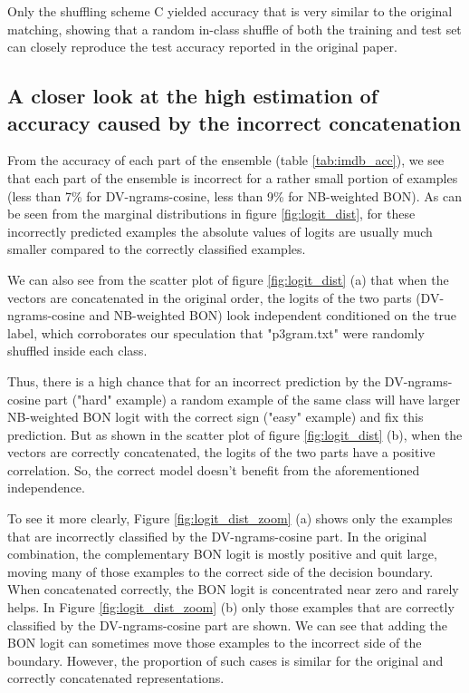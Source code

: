 \documentclass[11pt]{article}
\begin{document}
Only the shuffling scheme C yielded accuracy that is very similar to the original matching, showing that a random in-class shuffle of both the training and test set can closely reproduce the test accuracy reported in the original paper.

\subsection{A closer look at the high estimation of accuracy caused by the incorrect concatenation}
\label{sec:subsec_hard_n_easy}
From the accuracy of each part of the ensemble (table \ref{tab:imdb_acc}), we see that each part of the ensemble is incorrect for a rather small portion of examples (less than 7\% for DV-ngrams-cosine, less than 9\% for NB-weighted BON). As can be seen from the marginal distributions in figure \ref{fig:logit_dist}, for these incorrectly predicted examples the absolute values of logits are usually much smaller compared to the correctly classified examples. 

We can also see from the scatter plot of figure \ref{fig:logit_dist} (a) that when the vectors are concatenated in the original order, the logits of the two parts (DV-ngrams-cosine and NB-weighted BON) look independent conditioned on the true label, which corroborates our speculation that "p3gram.txt" were randomly shuffled inside each class. 

Thus, there is a high chance that for an incorrect prediction by the DV-ngrams-cosine part ("hard" example) a random example of the same class will have larger NB-weighted BON logit with the correct sign ("easy" example) and fix this prediction. But as shown in the scatter plot of figure \ref{fig:logit_dist} (b), when the vectors are correctly concatenated, the logits of the two parts have a positive correlation. So, the correct model doesn't benefit from the aforementioned independence.

To see it more clearly, Figure \ref{fig:logit_dist_zoom} (a) shows only the examples that are incorrectly classified by the DV-ngrams-cosine part. In the original combination, the complementary BON logit is mostly positive and quit large, moving many of those examples to the correct side of the decision boundary. When concatenated correctly, the BON logit is concentrated near zero and rarely helps. In Figure \ref{fig:logit_dist_zoom} (b) only those examples that are correctly classified by the DV-ngrams-cosine part are shown. We can see that adding the BON logit can sometimes move those examples to the incorrect side of the boundary. However, the proportion of such cases is similar for the original and correctly concatenated representations.
\end{document}
